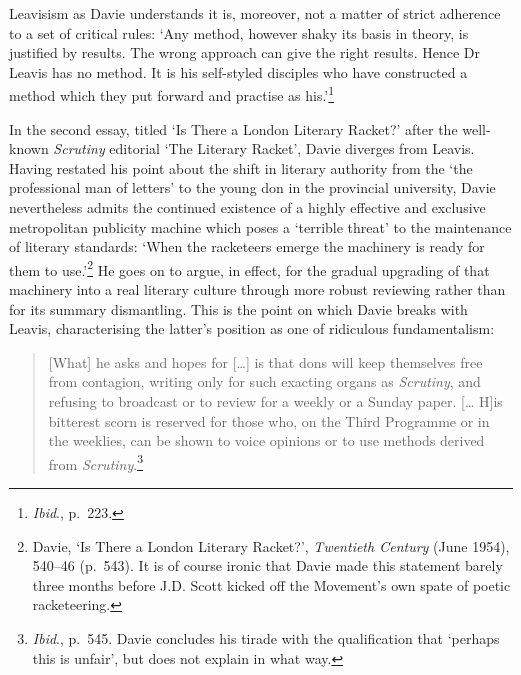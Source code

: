 \documentclass[]{article}
\begin{document}
\noindent Leavisism as Davie understands it is, moreover, not a matter
of strict adherence to a set of critical rules: `Any method, however
shaky its basis in theory, is justified by results. The wrong approach
can give the right results. Hence Dr Leavis has no method. It is his
self-styled disciples who have constructed a method which they put
forward and practise as his.'\footnote{\emph{Ibid}., p.~223.}

In the second essay, titled `Is There a London Literary Racket?' after
the well-known \emph{Scrutiny} editorial `The Literary Racket', Davie
diverges from Leavis. Having restated his point about the shift in
literary authority from the `the professional man of letters' to the
young don in the provincial university, Davie nevertheless admits the
continued existence of a highly effective and exclusive metropolitan
publicity machine which poses a `terrible threat' to the maintenance of
literary standards: `When the racketeers emerge the machinery is ready
for them to use.'\footnote{Davie, `Is There a London Literary Racket?',
  \emph{Twentieth Century} (June 1954), 540--46 (p.~543). It is of
  course ironic that Davie made this statement barely three months
  before J.D. Scott kicked off the Movement's own spate of poetic
  racketeering.} He goes on to argue, in effect, for the gradual
upgrading of that machinery into a real literary culture through more
robust reviewing rather than for its summary dismantling. This is the
point on which Davie breaks with Leavis, characterising the latter's
position as one of ridiculous fundamentalism:

\begin{quote}
{[}What{]} he asks and hopes for {[}\ldots{}{]} is that dons will keep
themselves free from contagion, writing only for such exacting organs as
\emph{Scrutiny}, and refusing to broadcast or to review for a weekly or
a Sunday paper. {[}\ldots{} H{]}is bitterest scorn is reserved for those
who, on the Third Programme or in the weeklies, can be shown to voice
opinions or to use methods derived from \emph{Scrutiny}.\footnote{\emph{Ibid}.,
  p.~545. Davie concludes his tirade with the qualification that
  `perhaps this is unfair', but does not explain in what way.}
\end{quote}
\end{document}
